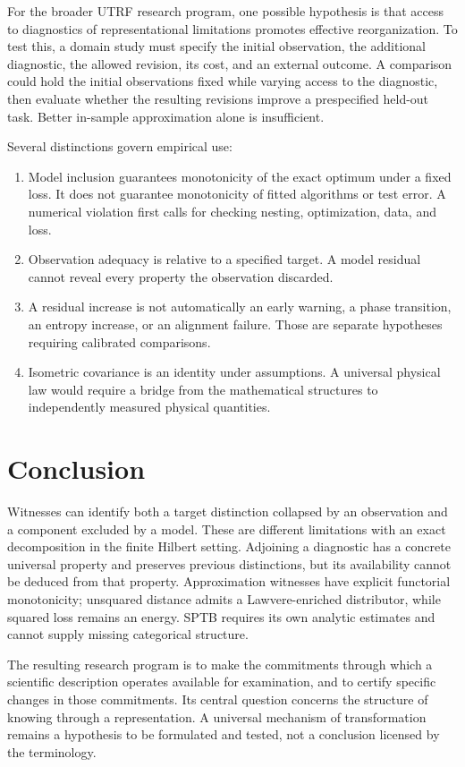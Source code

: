 \documentclass[11pt,letterpaper]{article}
\begin{document}
For the broader UTRF research program, one possible hypothesis is that
access to diagnostics of representational limitations promotes
effective reorganization. To test this, a domain study must specify
the initial observation, the additional diagnostic, the allowed
revision, its cost, and an external outcome. A comparison could hold
the initial observations fixed while varying access to the diagnostic,
then evaluate whether the resulting revisions improve a prespecified
held-out task. Better in-sample approximation alone is insufficient.

Several distinctions govern empirical use:
\begin{enumerate}[leftmargin=1.8em]
\item Model inclusion guarantees monotonicity of the exact optimum
under a fixed loss. It does not guarantee monotonicity of fitted
algorithms or test error. A numerical violation first calls for
checking nesting, optimization, data, and loss.
\item Observation adequacy is relative to a specified target.
A model residual cannot reveal every property the observation discarded.
\item A residual increase is not automatically an early warning, a
phase transition, an entropy increase, or an alignment failure.
Those are separate hypotheses requiring calibrated comparisons.
\item Isometric covariance is an identity under assumptions. A universal
physical law would require a bridge from the mathematical structures
to independently measured physical quantities.
\end{enumerate}

\section{Conclusion}
Witnesses can identify both a target distinction collapsed by an
observation and a component excluded by a model. These are different
limitations with an exact decomposition in the finite Hilbert setting.
Adjoining a diagnostic has a concrete universal property and preserves
previous distinctions, but its availability cannot be deduced from that
property. Approximation witnesses have explicit functorial monotonicity;
unsquared distance admits a Lawvere-enriched distributor, while squared
loss remains an energy. SPTB requires its own analytic estimates and
cannot supply missing categorical structure.

The resulting research program is to make the commitments through
which a scientific description operates available for examination,
and to certify specific changes in those commitments. Its central
question concerns the structure of knowing through a representation.
A universal mechanism of transformation remains a hypothesis to be
formulated and tested, not a conclusion licensed by the terminology.
\end{document}
